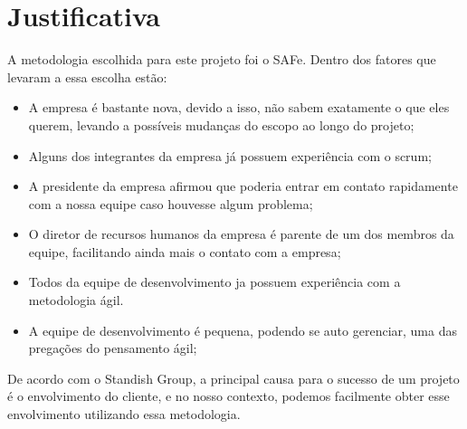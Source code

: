 \section{Justificativa}

  A metodologia escolhida para este projeto foi o SAFe. Dentro dos fatores que levaram a essa escolha estão:

  \begin{itemize}
    \item A empresa é bastante nova, devido a isso, não sabem exatamente o que eles querem, levando a possíveis mudanças do escopo ao
          longo do projeto;
    \item Alguns dos integrantes da empresa já possuem experiência com o scrum;
    \item A presidente da empresa afirmou que poderia entrar em contato rapidamente com a nossa equipe caso houvesse algum problema;
    \item O diretor de recursos humanos da empresa é parente de um dos membros da equipe, facilitando ainda mais o contato com a empresa;
    \item Todos da equipe de desenvolvimento ja possuem experiência com a metodologia ágil.
    \item A equipe de desenvolvimento é pequena, podendo se auto gerenciar, uma das pregações do pensamento ágil;
  \end{itemize}

  De acordo com o Standish Group\cite{standishgroup}, a principal causa para o sucesso de um projeto é o envolvimento do cliente, e no
  nosso contexto, podemos facilmente obter esse envolvimento utilizando essa metodologia.

